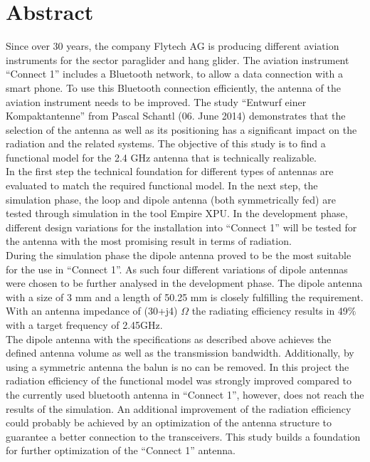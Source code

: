 \newpage
\section*{Abstract}
Since over 30 years, the company Flytech AG is producing different aviation instruments for the sector paraglider and hang glider. The aviation instrument “Connect 1” includes a Bluetooth network, to allow a data connection with a smart phone. To use this Bluetooth connection efficiently, the antenna of the aviation instrument needs to be improved. The study “Entwurf einer Kompaktantenne” from Pascal Schantl (06. June 2014) demonstrates that the selection of the antenna as well as its positioning has a significant impact on the radiation and the related systems. The objective of this study is to find a functional model for the 2.4 GHz antenna that is technically realizable.\\
In the first step the technical foundation for different types of antennas are evaluated to match the required functional model. In the next step, the simulation phase, the loop and dipole antenna (both symmetrically fed) are tested through simulation in the tool Empire XPU.  In the development phase, different design variations for the installation into “Connect 1” will be tested for the antenna with the most promising result in terms of radiation.\\
During the simulation phase the dipole antenna proved to be the most suitable for the use in “Connect 1”. As such four different variations of dipole antennas were chosen to be further analysed in the development phase. The dipole antenna with a size of 3 mm and a length of 50.25 mm is closely fulfilling the requirement. With an antenna impedance of (30+j4) $\Omega$ the radiating efficiency results in 49$\%$ with a target frequency of 2.45GHz.\\
The dipole antenna with the specifications as described above achieves the defined antenna volume as well as the transmission bandwidth. Additionally, by using a symmetric antenna the balun is no can be removed. In this project the radiation efficiency of the functional model was strongly improved compared to the currently used bluetooth antenna in “Connect 1”, however, does not reach the results of the simulation. An additional improvement of the radiation efficiency could probably be achieved by an optimization of the antenna structure to guarantee a better connection to the transceivers. This study builds a foundation for further optimization of the “Connect 1” antenna.
